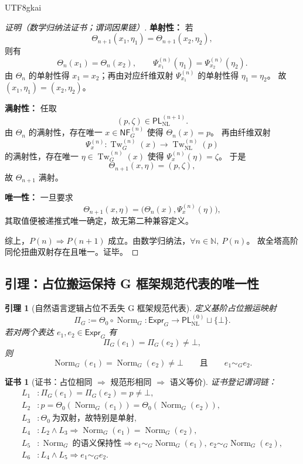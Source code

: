 \documentclass[12pt]{article}
\newtheorem{lemma}{引理}[section]
\newtheorem{Certificate}{证书}[section]
\newcommand{\NN}{\mathbb{N}}
\newcommand{\Norm}{\operatorname{Norm}}
\newcommand{\Tw}{\operatorname{Tw}}
\begin{document}
\begin{CJK*}{UTF8}{gkai}
\begin{proof}[证明（数学归纳法证书；谓词因果链）]
\textbf{单射性：}
若
\[
  \Theta_{n+1}(x_1,\eta_1)=\Theta_{n+1}(x_2,\eta_2),
\]
则有
\[
  \Theta_n(x_1)=\Theta_n(x_2),
  \qquad
  \Psi_{x_1}^{(n)}(\eta_1)=\Psi_{x_2}^{(n)}(\eta_2).
\]
由 $\Theta_n$ 的单射性得 $x_1=x_2$；再由对应纤维双射 $\Psi_{x_1}^{(n)}$ 的单射性得 $\eta_1=\eta_2$。
故 $(x_1,\eta_1)=(x_2,\eta_2)$。

\textbf{满射性：}
任取
\[
  (p,\zeta)\in \mathsf{PL}_{\mathrm{NL}}^{(n+1)}.
\]
由 $\Theta_n$ 的满射性，存在唯一 $x\in \mathsf{NF}_G^{(n)}$ 使得 $\Theta_n(x)=p$。
再由纤维双射
\[
  \Psi_x^{(n)}:\Tw_G^{(n)}(x)\to \Tw_{\mathrm{NL}}^{(n)}(p)
\]
的满射性，存在唯一 $\eta\in \Tw_G^{(n)}(x)$ 使得 $\Psi_x^{(n)}(\eta)=\zeta$。
于是
\[
  \Theta_{n+1}(x,\eta)=(p,\zeta),
\]
故 $\Theta_{n+1}$ 满射。

\textbf{唯一性：}
一旦要求
\[
  \Theta_{n+1}(x,\eta)=\bigl(\Theta_n(x),\Psi_x^{(n)}(\eta)\bigr),
\]
其取值便被递推式唯一确定，故无第二种兼容定义。

综上，$P(n)\Rightarrow P(n+1)$ 成立。由数学归纳法，$\forall n\in\NN,\ P(n)$。
故全塔高阶同伦扭曲双射存在且唯一。证毕。
\end{proof}

\subsection{引理：占位搬运保持 G 框架规范代表的唯一性}
\label{subsec:tex37-lemma}

\begin{lemma}[自然语言逻辑占位不丢失 G 框架规范代表]
\label{lem:tex37-placeholder-uniqueness}
定义基阶占位搬运映射
\[
  \Pi_G:=\Theta_0\circ \Norm_G:\mathsf{Expr}_G\to \mathsf{PL}_{\mathrm{NL}}^{(0)}\sqcup\{\bot\}.
\]
若对两个表达 $e_1,e_2\in\mathsf{Expr}_G$ 有
\[
  \Pi_G(e_1)=\Pi_G(e_2)\neq\bot,
\]
则
\[
  \Norm_G(e_1)=\Norm_G(e_2)\neq\bot
  \qquad\text{且}\qquad
  e_1\sim_G e_2.
\]
\end{lemma}

\begin{Certificate}[证书：占位相同 $\Rightarrow$ 规范形相同 $\Rightarrow$ 语义等价]
\label{cert:tex37-placeholder-uniqueness}
证书登记谓词链：
\[
\begin{aligned}
  L_1 &: \Pi_G(e_1)=\Pi_G(e_2)=p\neq\bot,\\
  L_2 &: p=\Theta_0(\Norm_G(e_1))=\Theta_0(\Norm_G(e_2)),\\
  L_3 &: \Theta_0\ \text{为双射，故特别是单射},\\
  L_4 &: L_2\wedge L_3\Rightarrow \Norm_G(e_1)=\Norm_G(e_2),\\
  L_5 &: \Norm_G\ \text{的语义保持性}\Rightarrow e_1\sim_G \Norm_G(e_1),\ e_2\sim_G \Norm_G(e_2),\\
  L_6 &: L_4\wedge L_5\Rightarrow e_1\sim_G e_2.
\end{aligned}
\]
\end{Certificate}


\end{CJK*}
\end{document}

